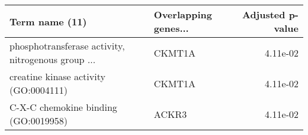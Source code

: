 \begin{tabular}{llr}
\toprule
                                    Term name (11) & Overlapping genes... &  Adjusted p-value \\
\midrule
phosphotransferase activity, nitrogenous group ... &               CKMT1A &          4.11e-02 \\
             creatine kinase activity (GO:0004111) &               CKMT1A &          4.11e-02 \\
              C-X-C chemokine binding (GO:0019958) &                ACKR3 &          4.11e-02 \\
\bottomrule
\end{tabular}
